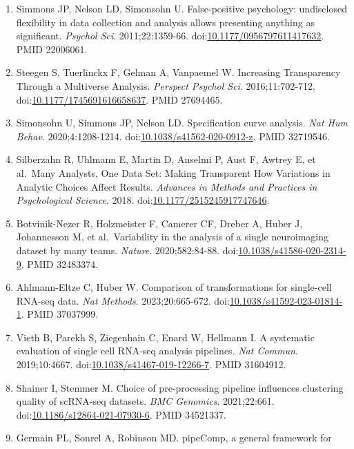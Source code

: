 \documentclass[11pt]{article}
\begin{document}
\begin{enumerate}
  PMID 16060722.
\item
  Simmons JP, Nelson LD, Simonsohn U. False-positive psychology:
  undisclosed flexibility in data collection and analysis allows
  presenting anything as significant. \emph{Psychol Sci}.
  2011;22:1359-66.
  doi:\href{https://doi.org/10.1177/0956797611417632}{10.1177/0956797611417632}.
  PMID 22006061.
\item
  Steegen S, Tuerlinckx F, Gelman A, Vanpaemel W. Increasing
  Transparency Through a Multiverse Analysis. \emph{Perspect Psychol
  Sci}. 2016;11:702-712.
  doi:\href{https://doi.org/10.1177/1745691616658637}{10.1177/1745691616658637}.
  PMID 27694465.
\item
  Simonsohn U, Simmons JP, Nelson LD. Specification curve analysis.
  \emph{Nat Hum Behav}. 2020;4:1208-1214.
  doi:\href{https://doi.org/10.1038/s41562-020-0912-z}{10.1038/s41562-020-0912-z}.
  PMID 32719546.
\item
  Silberzahn R, Uhlmann E, Martin D, Anselmi P, Aust F, Awtrey E, et
  al.~Many Analysts, One Data Set: Making Transparent How Variations in
  Analytic Choices Affect Results. \emph{Advances in Methods and
  Practices in Psychological Science}. 2018.
  doi:\href{https://doi.org/10.1177/2515245917747646}{10.1177/2515245917747646}.
\item
  Botvinik-Nezer R, Holzmeister F, Camerer CF, Dreber A, Huber J,
  Johannesson M, et al.~Variability in the analysis of a single
  neuroimaging dataset by many teams. \emph{Nature}. 2020;582:84-88.
  doi:\href{https://doi.org/10.1038/s41586-020-2314-9}{10.1038/s41586-020-2314-9}.
  PMID 32483374.
\item
  Ahlmann-Eltze C, Huber W. Comparison of transformations for
  single-cell RNA-seq data. \emph{Nat Methods}. 2023;20:665-672.
  doi:\href{https://doi.org/10.1038/s41592-023-01814-1}{10.1038/s41592-023-01814-1}.
  PMID 37037999.
\item
  Vieth B, Parekh S, Ziegenhain C, Enard W, Hellmann I. A systematic
  evaluation of single cell RNA-seq analysis pipelines. \emph{Nat
  Commun}. 2019;10:4667.
  doi:\href{https://doi.org/10.1038/s41467-019-12266-7}{10.1038/s41467-019-12266-7}.
  PMID 31604912.
\item
  Shainer I, Stemmer M. Choice of pre-processing pipeline influences
  clustering quality of scRNA-seq datasets. \emph{BMC Genomics}.
  2021;22:661.
  doi:\href{https://doi.org/10.1186/s12864-021-07930-6}{10.1186/s12864-021-07930-6}.
  PMID 34521337.
\item
  Germain PL, Sonrel A, Robinson MD. pipeComp, a general framework for

\end{enumerate}
\end{document}
